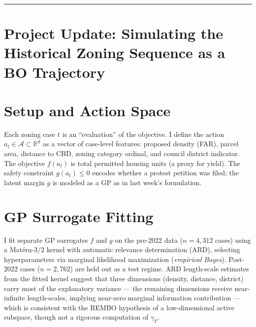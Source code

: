 \documentclass[11pt,twoside]{article}
\begin{document}
\newpage
\vspace{1em}
\hrule
\vspace{1em}
\section*{Project Update: Simulating the Historical Zoning Sequence as a BO Trajectory}
\thispagestyle{empty}

\begin{abstract}
Last week I proposed framing Austin's 7,074 discretionary zoning cases as a constrained Bayesian Optimization trajectory. This week I began operationalizing that framing: constructing the action space, defining the objective and constraint surrogates, and running a retrospective counterfactual comparing the historical approval sequence against an idealized GP-UCB policy.
\end{abstract}

\section*{Setup and Action Space}
Each zoning case $t$ is an ``evaluation'' of the objective. I define the action $a_t \in \mathcal{A} \subset \mathbb{R}^d$ as a vector of case-level features: proposed density (FAR), parcel area, distance to CBD, zoning category ordinal, and council district indicator. The objective $f(a_t)$ is total permitted housing units (a proxy for yield). The safety constraint $g(a_t) \leq 0$ encodes whether a protest petition was filed; the latent margin $g$ is modeled as a GP as in last week's formulation.

\section*{GP Surrogate Fitting}
I fit separate GP surrogates $f$ and $g$ on the pre-2022 data ($n = 4{,}312$ cases) using a Matérn-$3/2$ kernel with automatic relevance determination (ARD), selecting hyperparameters via marginal likelihood maximization (\emph{empirical Bayes}). Post-2022 cases ($n = 2{,}762$) are held out as a test regime. ARD length-scale estimates from the fitted kernel suggest that three dimensions (density, distance, district) carry most of the explanatory variance --- the remaining dimensions receive near-infinite length-scales, implying near-zero marginal information contribution --- which is consistent with the REMBO hypothesis of a low-dimensional active subspace, though not a rigorous computation of $\gamma_T$.
\end{document}
